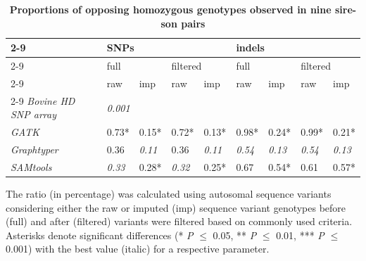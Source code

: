 \documentclass[../main.tex]{subfiles}
\begin{document}
\begin{table}
            \begin{center}
            \caption[Proportions of opposing homozygous genotypes observed in nine sire-son pairs]{\textbf{Proportions of opposing homozygous genotypes observed in nine sire-son pairs}}
            \small
            \begin{tabular}{|l|l|l|l|l|l|l|l|l|} 
            \cline{2-9}
            \multicolumn{1}{l!{\color{black}\vrule}}{~} & \multicolumn{4}{l|}{SNPs}                                     & \multicolumn{4}{l|}{indels}                                    \\ 
            \cline{2-9}
            \multicolumn{1}{l|}{~}                      & \multicolumn{2}{l|}{full}     & \multicolumn{2}{l|}{filtered} & \multicolumn{2}{l|}{full}     & \multicolumn{2}{l|}{filtered}  \\ 
            \cline{2-9}
            \multicolumn{1}{l|}{~}                      & raw           & imp           & raw           & imp           & raw           & imp           & raw           & imp            \\ 
            \cline{2-9}
            \textit{Bovine HD SNP array}                & \multicolumn{8}{l|}{\textit{0.001}}                                                                                            \\ 
            \hline
            \textit{GATK}                               & 0.73*         & 0.15*         & 0.72*         & 0.13*         & 0.98*         & 0.24*         & 0.99*         & 0.21*          \\ 
            \hline
            \textit{Graphtyper}                         & 0.36          & \textit{0.11} & 0.36          & \textit{0.11} & \textit{0.54} & \textit{0.13} & \textit{0.54} & \textit{0.13}  \\ 
            \hline
            \textit{SAMtools}                           & \textit{0.33} & 0.28*         & \textit{0.32} & 0.25*         & 0.67          & 0.54*         & 0.61          & 0.57*          \\
            \hline
            \end{tabular}
            \label{tab:mendel}
            \end{center}
            \singlespacing
            \small{The ratio (in percentage) was calculated using autosomal sequence variants considering either 
            the raw or imputed (imp) sequence variant genotypes before (full) and after (filtered) variants were filtered based on commonly used criteria. 
            Asterisks denote significant differences (* \emph{P} $\leq$ 0.05, ** \emph{P} $\leq$ 0.01, *** \emph{P} $\leq$ 0.001) with the best value (italic) for a respective parameter.}

\end{table}
\end{document}
